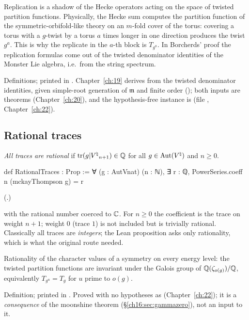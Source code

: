 \begin{physics}
Replication is a shadow of the Hecke operators acting on the space of twisted partition functions.  Physically, the
Hecke sum computes the partition function of the symmetric-orbifold-like theory on an $m$-fold cover of the torus:
covering a torus with a $g$-twist by a torus $a$ times longer in one direction produces the twist $g^a$.  This is why
the replicate in the $a$-th block is $T_{g^a}$.  In Borcherds' proof the replication formulas come out of the twisted
denominator identities of the Monster Lie algebra, i.e.\ from the string spectrum.
\end{physics}
\begin{status}
Definitions; printed in .  Chapter~\ref{ch:19} derives
 from the twisted denominator identities, given simple-root generation of $\mathfrak m$ and
finite order (); both inputs are theorems (Chapter~\ref{ch:20}),
and the hypothesis-free instance is  (file
, Chapter~\ref{ch:22}).
\end{status}

\subsection{Rational traces}

\begin{definition}\label{ch16:def:rational}
\emph{All traces are rational} if $\operatorname{tr}(g|{V^{\natural}}_{n+1})\in{\mathbb{Q}}$ for all $g\in\operatorname{Aut}({V^{\natural}})$ and $n\ge0$.
\end{definition}
\begin{leancode}
def RationalTraces : Prop :=
  ∀ (g : AutVnat) (n : ℕ), ∃ r : ℚ, PowerSeries.coeff n (mckayThompson g) = r
\end{leancode}
(.)
\begin{dictionary}
 with the rational number  coerced to ${\mathbb{C}}$.  For $n\ge0$ the coefficient is the trace
on weight $n+1$; weight $0$ (trace $1$) is not included but is trivially rational.  Classically all traces are
\emph{integers}; the Lean proposition asks only rationality, which is what the original route needed.
\end{dictionary}
\begin{physics}
Rationality of the character values of a symmetry on every energy level: the twisted partition functions are
invariant under the Galois group of ${\mathbb{Q}}(\zeta_{o(g)})/{\mathbb{Q}}$, equivalently $T_{g^u}=T_g$ for $u$ prime to $o(g)$.
\end{physics}
\begin{status}
Definition; printed in .  Proved with no hypotheses as
 (Chapter~\ref{ch:22}); it is a \emph{consequence} of the moonshine theorem
(\S\ref{ch16:sec:gammazero}), not an input to it.
\end{status}

